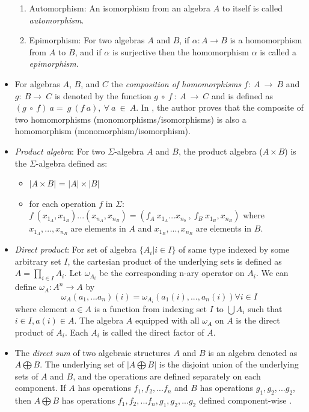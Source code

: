 \begin{itemize}
\begin{enumerate}
        \item Automorphism: An isomorphism from an algebra $A$ to itself is
        called \textit{automorphism}.

        \item Epimorphism: For two algebras $A$ and $B$, if \(\alpha : A
        \rightarrow B \) is a homomorphism from $A$ to $B$, and if \(\alpha\) is
        surjective then the homomorphism \(\alpha\) is called a
        \textit{epimorphism}.
    \end{enumerate}

    \item For algebras $A$, $B$, and $C$ the \textit{composition of
    homomorphisms} $f:\ A \ \rightarrow \ B$ and $g:\ B \rightarrow\ C$ is
    denoted by the function $g\ \circ \ f\ :\ A\ \rightarrow \ C$ and is defined
    as $(g\ \circ \ f)\ a = \ g\ (f\ a), \ \forall \ a\ \in\ A$. In
    \cite{sankappanavar1981course}, the author proves that the composite of two
    homomorphisms (monomorphisms/isomorphisms) is also a homomorphism
    (monomorphism/isomorphism).
    
    \item \textit{Product algebra}: For two $\Sigma$-algebra $A$ and $B$, the
    product algebra ($A \times B$) is the $\Sigma$-algebra defined as:
    \begin{itemize}
      \item $|A \times B|$ = $|A| \times |B|$ 
      \item for each operation $f$ in $\Sigma$: $f\
      (x_{1_A},x_{1_B})...(x_{n_A},x_{n_B}) = (f_A\ x_{1_A}...x_{n_b}\ ,\ f_B\
      x_{1_B},x_{n_B} )$ where $x_{1_A},...,x_{n_B}$ are elements in $A$ and
      $x_{1_B},...,x_{n_B}$ are elements in $B$. 
    \end{itemize}

    \item \textit{Direct product}: For set of algebra $\{ A_i | i \in I \}$ of
    same type indexed by some arbitrary set $I$, the cartesian product of the
    underlying sets is defined as $A = \displaystyle \prod_{i\in I} A_i$. Let
    $\omega_{A_i}$ be the corresponding n-ary operator on $A_i$. We can define
    $\omega_A : A^{n} \rightarrow A$ by \[ \omega_A(a_1,...a_n)(i) =
    \omega_{A_i} (a_1(i),...,a_n(i)) \forall i \in I\] where element $a \in A$
    is a function from indexing set $I$ to $\bigcup A_i$ such that $i \in I,
    a(i) \in A$. The algebra $A$ equipped with all $\omega_A$ on $A$ is the
    direct product of $A_i$. Each $A_i$ is called the direct factor of $A$. 

    \item The \textit{direct sum} of two algebraic structures $A$ and $B$ is an
    algebra denoted as $A \bigoplus B$. The underlying set of $|A \bigoplus B|$
    is the disjoint union of the underlying sets of $A$ and $B$, and the
    operations are defined separately on each component. If $A$ has operations
    $f_1, f_2, ... f_n$ and $B$ has operations $g_1,g_2, ... g_2$, then $A
    \bigoplus B$ has operations $f_1, f_2, ... f_n,g_1,g_2, ... g_2$ defined
    component-wise \cite{directproduct}. 
    
\end{itemize}